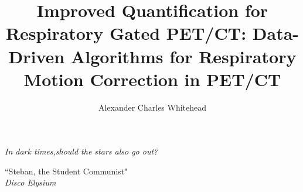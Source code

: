 
\title{Improved Quantification for Respiratory Gated PET/CT: Data-Driven Algorithms for Respiratory Motion Correction in PET/CT}
\author{Alexander Charles Whitehead}

\maketitle




\thispagestyle{empty}
\vspace*{\fill}
\setlength{\epigraphwidth}{0.7\linewidth}
\renewcommand{\epigraphflush}{center}
\renewcommand{\epigraphsize}{\large}
\epigraph{\textit{In dark times,\newline should the stars also go out?}}%
         {``Steban, the Student Communist"\\ \textit{Disco Elysium}}
\vfill

